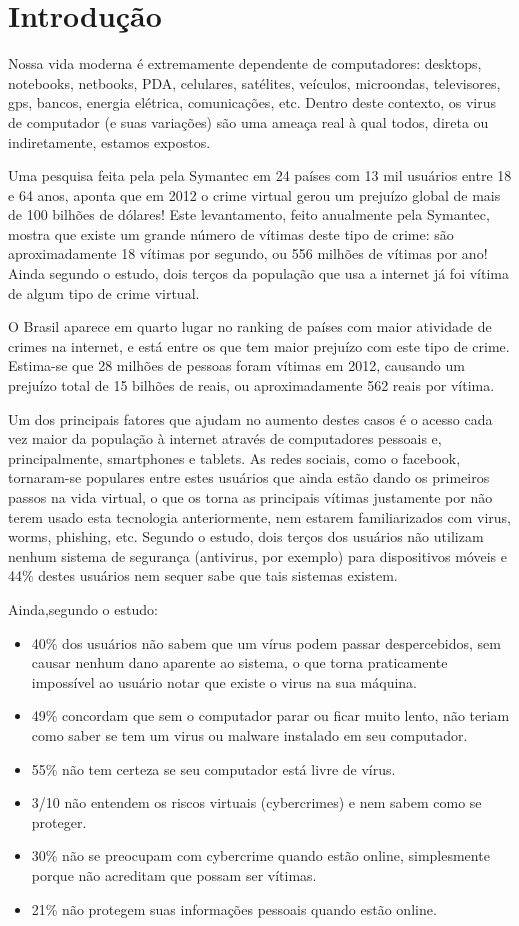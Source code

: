 \chapter{Introdução}

Nossa vida moderna é extremamente dependente de computadores: desktops, notebooks, netbooks, PDA, celulares, satélites, veículos, microondas, televisores, gps, bancos, energia elétrica, comunicações, etc. Dentro deste contexto, os virus de computador (e suas variações) são uma ameaça real à qual todos, direta ou indiretamente, estamos expostos.

Uma pesquisa feita pela pela Symantec\cite{symantec:7,symantec:8} em 24 países com 13 mil usuários entre 18 e 64 anos, aponta que em 2012 o crime virtual gerou um prejuízo global de mais de 100 bilhões de dólares! Este levantamento, feito anualmente pela Symantec, mostra que existe um grande número de vítimas deste tipo de crime: são aproximadamente 18 vítimas por segundo, ou 556 milhões de vítimas por ano! Ainda segundo o estudo, dois terços da população que usa a internet já foi vítima de algum tipo de crime virtual.

O Brasil aparece em quarto lugar no ranking de países com maior atividade de crimes na internet\cite{uolnoticia:1}, e está entre os que tem maior prejuízo com este tipo de crime. Estima-se que 28 milhões de pessoas foram vítimas em 2012, causando um prejuízo total de 15 bilhões de reais, ou aproximadamente 562 reais por vítima.

Um dos principais fatores que ajudam no aumento destes casos é o acesso cada vez maior da população à internet através de computadores pessoais e, principalmente, smartphones e tablets. As redes sociais, como o facebook, tornaram-se populares entre estes usuários que ainda estão dando os primeiros passos na vida virtual, o que os torna as principais vítimas justamente por não terem usado esta tecnologia anteriormente, nem estarem familiarizados com virus, worms, phishing, etc. Segundo o estudo, dois terços dos usuários não utilizam nenhum sistema de segurança (antivirus, por exemplo) para dispositivos móveis e 44\% destes usuários nem sequer sabe que tais sistemas existem.

Ainda,segundo o estudo:
\begin{itemize}
\item 40\% dos usuários não sabem que um vírus podem passar despercebidos, sem causar nenhum dano aparente ao sistema, o que torna praticamente impossível ao usuário notar que existe o virus na sua máquina. 
\item 49\% concordam que sem o computador parar ou ficar muito lento, não teriam como saber se tem um virus ou malware instalado em seu computador. 
\item 55\% não tem certeza se seu computador está livre de vírus.
\item 3/10 não entendem os riscos virtuais (cybercrimes) e nem sabem como se proteger.
\item 30\% não se preocupam com cybercrime quando estão online, simplesmente porque não acreditam que possam ser vítimas.
\item 21\% não protegem suas informações pessoais quando estão online.
\end{itemize}

